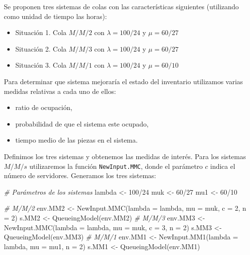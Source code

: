 \documentclass[
]{book}
\newenvironment{Shaded}{\begin{snugshade}}{\end{snugshade}}
\newcommand{\AttributeTok}[1]{\textcolor[rgb]{0.77,0.63,0.00}{#1}}
\newcommand{\CommentTok}[1]{\textcolor[rgb]{0.56,0.35,0.01}{\textit{#1}}}
\newcommand{\DecValTok}[1]{\textcolor[rgb]{0.00,0.00,0.81}{#1}}
\newcommand{\FunctionTok}[1]{\textcolor[rgb]{0.00,0.00,0.00}{#1}}
\newcommand{\NormalTok}[1]{#1}
\newcommand{\OtherTok}[1]{\textcolor[rgb]{0.56,0.35,0.01}{#1}}
\newcommand{\SpecialCharTok}[1]{\textcolor[rgb]{0.00,0.00,0.00}{#1}}
\providecommand{\tightlist}{%
  \setlength{\itemsep}{0pt}\setlength{\parskip}{0pt}}
\theoremstyle{definition}
\theoremstyle{definition}
\theoremstyle{definition}
\theoremstyle{definition}
\theoremstyle{remark}
\begin{document}
Se proponen tres sistemas de colas con las características siguientes (utilizando como unidad de tiempo las horas):

\begin{itemize}
\tightlist
\item
  Situación 1. Cola \(M/M/2\) con \(\lambda = 100/24\) y \(\mu = 60/27\)
\item
  Situación 2. Cola \(M/M/3\) con \(\lambda = 100/24\) y \(\mu = 60/27\)
\item
  Situación 3. Cola \(M/M/1\) con \(\lambda = 100/24\) y \(\mu = 60/10\)
\end{itemize}

Para determinar que sistema mejoraría el estado del inventario utilizamos varias medidas relativas a cada uno de ellos:

\begin{itemize}
\tightlist
\item
  ratio de ocupación,
\item
  probabilidad de que el sistema este ocupado,
\item
  tiempo medio de las piezas en el sistema.
\end{itemize}

Definimos los tres sistemas y obtenemos las medidas de interés. Para los sistemas \(M/M/s\) utilizaremos la función \texttt{NewInput.MMC}, donde el parámetro \(c\) indica el número de servidores. Generamos los tres sistemas:

\begin{Shaded}
\begin{Highlighting}[]
\CommentTok{\# Parámetros de los sistemas}
\NormalTok{lambda }\OtherTok{\textless{}{-}} \DecValTok{100}\SpecialCharTok{/}\DecValTok{24}
\NormalTok{muk }\OtherTok{\textless{}{-}} \DecValTok{60}\SpecialCharTok{/}\DecValTok{27}
\NormalTok{mu1 }\OtherTok{\textless{}{-}} \DecValTok{60}\SpecialCharTok{/}\DecValTok{10}

\CommentTok{\# M/M/2}
\NormalTok{env.MM2 }\OtherTok{\textless{}{-}} \FunctionTok{NewInput.MMC}\NormalTok{(}\AttributeTok{lambda =}\NormalTok{ lambda, }\AttributeTok{mu =}\NormalTok{ muk, }\AttributeTok{c =} \DecValTok{2}\NormalTok{, }\AttributeTok{n =} \DecValTok{2}\NormalTok{)}
\NormalTok{s.MM2 }\OtherTok{\textless{}{-}} \FunctionTok{QueueingModel}\NormalTok{(env.MM2)}
\CommentTok{\# M/M/3}
\NormalTok{env.MM3 }\OtherTok{\textless{}{-}} \FunctionTok{NewInput.MMC}\NormalTok{(}\AttributeTok{lambda =}\NormalTok{ lambda, }\AttributeTok{mu =}\NormalTok{ muk, }\AttributeTok{c =} \DecValTok{3}\NormalTok{, }\AttributeTok{n =} \DecValTok{2}\NormalTok{)}
\NormalTok{s.MM3 }\OtherTok{\textless{}{-}} \FunctionTok{QueueingModel}\NormalTok{(env.MM3)}
\CommentTok{\# M/M/1}
\NormalTok{env.MM1 }\OtherTok{\textless{}{-}} \FunctionTok{NewInput.MM1}\NormalTok{(}\AttributeTok{lambda =}\NormalTok{ lambda, }\AttributeTok{mu =}\NormalTok{ mu1, }\AttributeTok{n =} \DecValTok{2}\NormalTok{)}
\NormalTok{s.MM1 }\OtherTok{\textless{}{-}} \FunctionTok{QueueingModel}\NormalTok{(env.MM1)}
\end{Highlighting}
\end{Shaded}
\end{document}
